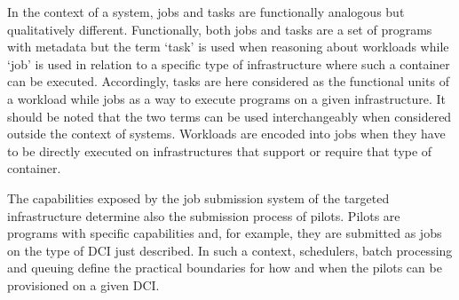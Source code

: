 \documentclass{sig-alternate}
\begin{document}
In the context of a \pilotjob system, jobs and tasks are functionally analogous but qualitatively different. Functionally, both jobs and tasks are a set of programs with metadata but the term `task' is used when reasoning about workloads while `job' is used in relation to a specific type of infrastructure where such a container can be executed. Accordingly, tasks are here considered as the functional units of a workload while jobs as a way to execute programs on a given infrastructure. It should be noted that the two terms can be used interchangeably when considered outside the context of \pilotjob systems. Workloads are encoded into jobs when they have to be directly executed on infrastructures that support or require that type of container.

 

    

The capabilities exposed by the job submission system of the targeted
infrastructure determine also the submission process of pilots. Pilots
are programs with specific capabilities and, for example, they are
submitted as jobs on the type of DCI just described. In such a
context, schedulers, batch processing and queuing define the practical
boundaries for how and when the pilots can be provisioned on a given
DCI.
\end{document}
